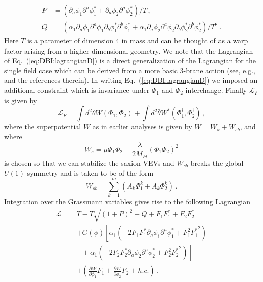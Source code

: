\documentclass[12pt]{article}
\begin{document}
\begin{equation} \label{eq:DBI:PQ}
  \begin{aligned}
    P &= \left(
        \partial_a \phi_1 \partial^a \phi^*_1
      + \partial_a \phi_2 \partial^a \phi^*_2
    \right) / T\,,\\
    Q &= \left(
        \alpha_1 \partial_a \phi_1 \partial^a \phi_1 \partial_b \phi^*_1 \partial^b \phi^*_1
      + \alpha_1 \partial_a \phi_2 \partial^a \phi_2 \partial_b \phi^*_2 \partial^b \phi^*_2
    \right) / T^2\,.
  \end{aligned}
\end{equation}
Here $T$ is a parameter of dimension 4 in mass and can be thought of as a warp factor arising from a higher dimensional geometry.
We note that the Lagrangian of Eq.~(\ref{eq:DBI:lagrangianD}) is a direct generalization of the Lagrangian for the single field case which can be derived from a more basic 3-brane action (see, e.g.,~\cite{Rocek:1997hi, Tseytlin:1999dj, Sasaki:2012ka} and the references therein).
In writing Eq.~(\ref{eq:DBI:lagrangianD}) we imposed an additional constraint which is invariance under $\Phi_1$ and $\Phi_2$ interchange.
Finally $\mathcal{L}_F$ is given by
\begin{equation}
  \mathcal{L}_F = \int d^2 \theta W\left(\Phi_1, \Phi_2\right)
                + \int d^2 \bar\theta W^*\left(\Phi_1^\dagger, \Phi_2^\dagger\right)\,,
\end{equation}
where the superpotential $W$ as in earlier analyses is given by $W = W_s + W_{sb}$, and where
\begin{equation}
W_s = \mu \Phi_1 \Phi_2 + \frac{\lambda}{2 M_{Pl}} \left(\Phi_1 \Phi_2\right)^2
\end{equation}
is chosen so that we can stabilize the saxion VEVs and $W_{sb}$ breaks the global $U\left(1\right)$ symmetry and is taken to be of the form
\begin{equation} \label{eq:dbi:Wsb}
  W_{sb} = \sum_{k = 1}^m \left(A_{k} \Phi_1^k + A_{k} \Phi_2^k\right)\,.
\end{equation}
Integration over the Grassmann variables gives rise to the following Lagrangian
\begin{equation} \label{eq:dbi:lagrangianIntermediate}
  \begin{aligned}
    \mathcal{L} =
      & T - T \sqrt{\left(1 + P\right)^2 - Q} + F_1 F^*_1 + F_2 F^*_2\\
      &+ G\left(\phi\right) \left[
        \alpha_1 \left(
          - 2 F_1 F^*_1 \partial_a \phi_1 \partial^a \phi^*_1
          + F_1^2 {F^*_1}^2
        \right)\right.\\
        &~~~ \left.{} + \alpha_1 \left(
          - 2 F_2 F^*_2 \partial_a \phi_2 \partial^a \phi^*_2
          + F_2^2 {F^*_2}^2
        \right)\right]\\
      &+ \left(
          \frac{\partial W}{\partial \phi_1} F_1
        + \frac{\partial W}{\partial \phi_2} F_2
        + h.c.
      \right)\,.
  \end{aligned}
\end{equation}
\end{document}
